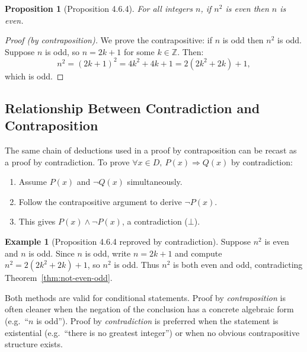 \documentclass[11pt, a4paper, notitlepage]{report}
\newtheorem{proposition}[theorem]{Proposition}
\theoremstyle{definition}
\newtheorem{example}[theorem]{Example}
\theoremstyle{remark}
\begin{document}
\begin{proposition}[Proposition 4.6.4]
\label{prop:n2even}
For all integers $n$, if $n^2$ is even then $n$ is even.
\end{proposition}

\begin{proof}[Proof (by contraposition)]
We prove the contrapositive: if $n$ is odd then $n^2$ is odd. Suppose $n$ is odd, so
$n = 2k + 1$ for some $k \in \mathbb{Z}$. Then:
\[
  n^2 = (2k+1)^2 = 4k^2 + 4k + 1 = 2(2k^2 + 2k) + 1,
\]
which is odd.
\end{proof}

\subsection{Relationship Between Contradiction and Contraposition}

The same chain of deductions used in a proof by contraposition can be recast as a proof by
contradiction. To prove $\forall x \in D,\ P(x) \Rightarrow Q(x)$ by contradiction:

\begin{enumerate}
  \item Assume $P(x)$ and $\lnot Q(x)$ simultaneously.
  \item Follow the contrapositive argument to derive $\lnot P(x)$.
  \item This gives $P(x) \land \lnot P(x)$, a contradiction ($\bot$).
\end{enumerate}

\begin{example}[Proposition 4.6.4 reproved by contradiction]
Suppose $n^2$ is even and $n$ is odd. Since $n$ is odd, write $n = 2k+1$ and compute
$n^2 = 2(2k^2 + 2k) + 1$, so $n^2$ is odd. Thus $n^2$ is both even and odd, contradicting
Theorem~\ref{thm:not-even-odd}.
\end{example}

\begin{examtip}[title={Exam Tip: Choosing Between Contradiction and Contraposition}]
Both methods are valid for conditional statements. Proof by \emph{contraposition} is often
cleaner when the negation of the conclusion has a concrete algebraic form (e.g.\ ``$n$ is
odd''). Proof by \emph{contradiction} is preferred when the statement is existential (e.g.\
``there is no greatest integer'') or when no obvious contrapositive structure exists.
\end{examtip}

\end{document}
